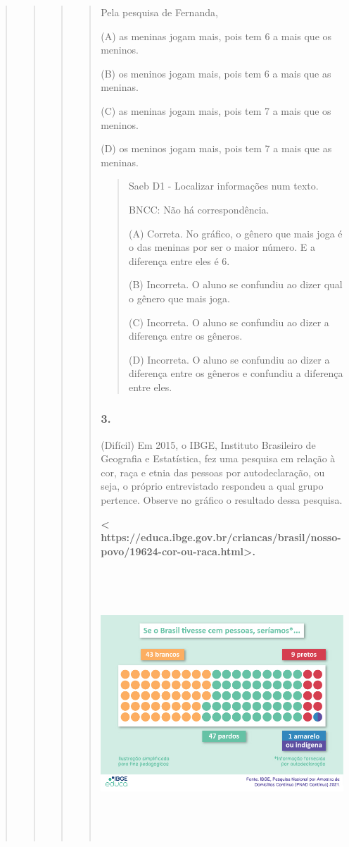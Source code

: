 \begin{quote}
\begin{quote}
\begin{quote}
\begin{quote}
Pela pesquisa de Fernanda,

(A) as meninas jogam mais, pois tem 6 a mais que os meninos.

(B) os meninos jogam mais, pois tem 6 a mais que as meninas.

(C) as meninas jogam mais, pois tem 7 a mais que os meninos.

(D) os meninos jogam mais, pois tem 7 a mais que as meninas.

\begin{quote}
Saeb D1 - Localizar informações num texto.

BNCC: Não há correspondência.

(A) Correta. No gráfico, o gênero que mais joga é o das meninas por ser
o maior número. E a diferença entre eles é 6.

(B) Incorreta. O aluno se confundiu ao dizer qual o gênero que mais
joga.

(C) Incorreta. O aluno se confundiu ao dizer a diferença entre os
gêneros.

(D) Incorreta. O aluno se confundiu ao dizer a diferença entre os
gêneros e confundiu a diferença entre eles.
\end{quote}

\subsubsection{3. }\label{section-70}

(Difícil) Em 2015, o IBGE, Instituto Brasileiro de Geografia e
Estatística, fez uma pesquisa em relação à cor, raça e etnia das pessoas
por autodeclaração, ou seja, o próprio entrevistado respondeu a qual
grupo pertence. Observe no gráfico o resultado dessa pesquisa.

\textbf{\textless{}
https://educa.ibge.gov.br/criancas/brasil/nosso-povo/19624-cor-ou-raca.html\textgreater{}.
}

\includegraphics[width=5.51042in,height=3.98702in]{media/image32.jpeg}


\end{quote}
\end{quote}
\end{quote}
\end{quote}
